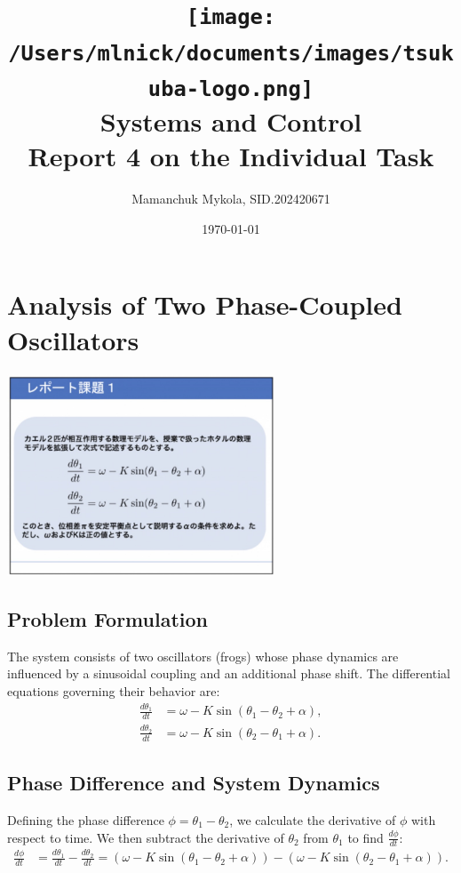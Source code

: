 \documentclass[12pt,a4paper]{article}
\title{
    \texttt{[image: /Users/mlnick/documents/images/tsukuba-logo.png]} \\
    \textbf{Systems and Control} \\
    \vspace{3mm}    
    Report 4 on the Individual Task
}
\author{Mamanchuk Mykola, SID.202420671}
\date{\today}
\begin{document}
\maketitle

\section{Analysis of Two Phase-Coupled Oscillators}

\begin{center}
    \includegraphics[width=0.6\textwidth]{materials/task0.jpeg}
\end{center}

\subsection{Problem Formulation}
The system consists of two oscillators (frogs) whose phase dynamics are influenced by a sinusoidal coupling and an additional phase shift. The differential equations governing their behavior are:
\begin{align}
    \frac{d\theta_1}{dt} &= \omega - K \sin(\theta_1 - \theta_2 + \alpha), \\
    \frac{d\theta_2}{dt} &= \omega - K \sin(\theta_2 - \theta_1 + \alpha).
\end{align}

\subsection{Phase Difference and System Dynamics}
Defining the phase difference \(\phi = \theta_1 - \theta_2\), we calculate the derivative of \(\phi\) with respect to time. We then subtract the derivative of \(\theta_2\) from \(\theta_1\) to find \(\frac{d\phi}{dt}\):
\begin{align}
    \frac{d\phi}{dt} &= \frac{d\theta_1}{dt} - \frac{d\theta_2}{dt} = \left(\omega - K \sin(\theta_1 - \theta_2 + \alpha)\right) - \left(\omega - K \sin(\theta_2 - \theta_1 + \alpha)\right).
\end{align}
\end{document}
